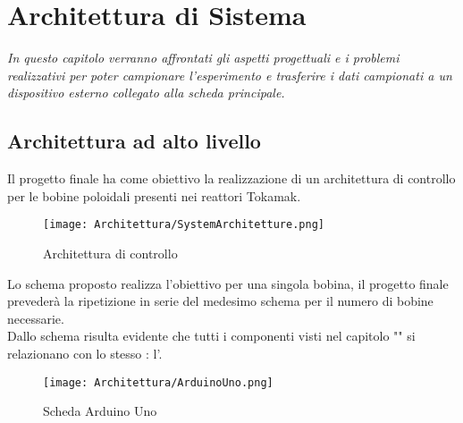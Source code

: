 \chapter{Architettura di Sistema}\label{cap:Architettura}

\begin{minipage}{12cm}\textit{
		In questo capitolo verranno affrontati gli aspetti progettuali e i problemi realizzativi per poter campionare l'esperimento e trasferire i dati campionati a un dispositivo esterno collegato alla scheda principale.
	}
\end{minipage}

\vspace*{1cm}

\section{Architettura ad alto livello}\label{sec:architettura}
Il progetto finale ha come obiettivo la realizzazione di un architettura di controllo per le bobine poloidali presenti nei reattori Tokamak.

\begin{figure}[H] \label{fig:archietturaControllo}
	\centering
	\caption[Schema finale dell'archiettettura di controllo]{Architettura di controllo}
	\texttt{[image: Architettura/SystemArchitetture.png]}
\end{figure}

\noindent
Lo schema proposto realizza l'obiettivo per una singola bobina, il progetto finale prevederà la ripetizione in serie del medesimo schema per il numero di bobine necessarie.\\
Dallo schema risulta evidente che tutti i componenti visti nel capitolo "" si relazionano con lo stesso \microControllore: l'\ArduinoUno.\vspace{-4mm}
\begin{figure}[H]
	\centering
	\caption[Scheda Arduino Uno]{Scheda Arduino Uno}
	\texttt{[image: Architettura/ArduinoUno.png]}
\end{figure}\vspace{-6mm}

